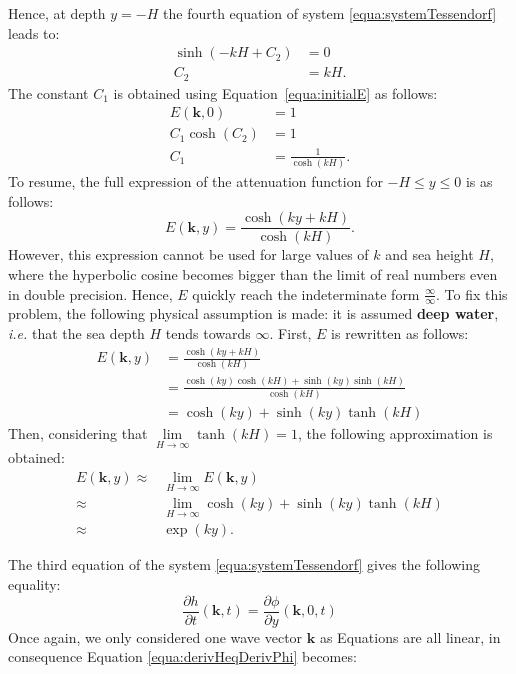 \documentclass[final]{jcgt}
\def\ie{\emph{i.e.}\xspace}
\begin{document}
Hence, at depth $y=-H$ the fourth equation of system \ref{equa:systemTessendorf} leads to:
\begin{align}
	\sinh(-kH+C_2) & = 0 \nonumber \\
	C_2            & = kH.
\end{align}
The constant $C_1$ is obtained using Equation~\ref{equa:initialE} as follows:
\begin{align}
	E(\mathbf{k},0) & =1\nonumber           \\
	C_1\cosh(C_2)   & =1\nonumber           \\
	C_1             & =\frac{1}{\cosh(kH)}.
\end{align}
To resume, the full expression of the attenuation function for $-H\leq y\leq 0$ is as follows:
\begin{equation}
	E(\mathbf{k}, y)=\frac{\cosh\left(ky+kH\right)}{\cosh(kH)}.
\end{equation}
However, this expression cannot be used for large values of $k$ and sea height $H$, where the hyperbolic cosine becomes bigger than the limit of real numbers even in double precision.
Hence, $E$ quickly reach the indeterminate form $\frac{\infty}{\infty}$.
To fix this problem, the following physical assumption is made: it is assumed \textbf{deep water}, \ie that the sea depth $H$ tends towards $\infty$.
First, $E$ is rewritten as follows:
\begin{align*}
	E(\mathbf{k},y) & = \frac{\cosh(ky+kH)}{\cosh(kH)}\nonumber                            \\
	                & = \frac{\cosh(ky)\cosh(kH) + \sinh(ky)\sinh(kH)}{\cosh(kH)}\nonumber \\
	                & = \cosh(ky) + \sinh(ky)\tanh(kH)
\end{align*}
Then, considering that $\underset{H \rightarrow \infty}{\lim}\tanh(kH)=1$, the following approximation is obtained:
\begin{align}\label{equa:attenuationDeep1}
	E(\mathbf{k},y) \approx & \underset{H \rightarrow \infty}{\lim} E(\mathbf{k},y)\nonumber               \\
	\approx                 & \underset{H \rightarrow \infty}{\lim}\cosh(ky) + \sinh(ky)\tanh(kH)\nonumber \\
	\approx                 & \exp(ky).
\end{align}

The third equation of the system \ref{equa:systemTessendorf} gives the following equality:
\begin{equation}
\label{equa:derivHeqDerivPhi}
\frac{\partial h}{\partial t}(\mathbf{k},t)=\frac{\partial\phi}{\partial y}(\mathbf{k}, 0, t)
\end{equation}
Once again, we only considered one wave vector $\mathbf{k}$ as Equations are all linear, in consequence Equation \ref{equa:derivHeqDerivPhi} becomes:
\end{document}
